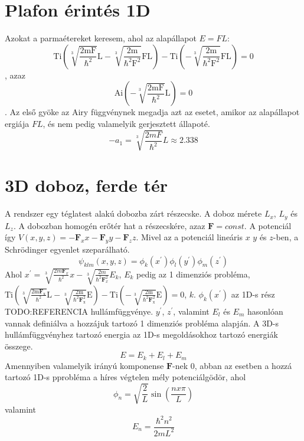 \documentclass[a4paper,titlepage]{article}
\newcommand{\Ai}[1]{\mathrm{Ai\left(#1\right)}}
\newcommand{\Ti}[1]{\mathrm{Ti\left(#1\right)}}
\begin{document}
	
\section{Plafon érintés 1D}
	Azokat a parmaétereket keresem, ahol az alapállapot $E = FL$:
	\begin{equation}
		\Ti{\sqrt[3]{\frac{2mF}{\hbar^2}}L - \sqrt[3]{\frac{2m}{\hbar^2F^2}}FL} - \Ti{-\sqrt[3]{\frac{2m}{\hbar^2F^2}}FL} = 0
	\end{equation}
	, azaz
	\begin{equation}
		\Ai{-\sqrt[3]{\frac{2mF}{\hbar^2}}L} = 0
	\end{equation}
	. Az első gyöke az Airy függvénynek megadja azt az esetet, amikor az alapállapot ergiája $FL$, és nem pedig valamelyik gerjesztett állapoté.
	\begin{equation}
		-a_1 = \sqrt[3]{\frac{2mF}{\hbar^2}}L \approx 2.338
	\end{equation}



\section{3D doboz, ferde tér}
    A rendszer egy téglatest alakú dobozba zárt részecske. A doboz mérete $L_x$, $L_y$ és $L_z$. A dobozban homogén erőtér hat a részecskére, azaz $\boldsymbol{F} = const$. A potenciál így $V(x, y, z) = -\boldsymbol{F}_xx-\boldsymbol{F}_yy-\boldsymbol{F}_zz$. Mivel az a potenciál lineáris $x$ $y$ és $z$-ben, a Schrödinger egyenlet szeparálható.
    \begin{equation}
        \psi_{klm}\left(x, y, z\right) = \phi_k \left( x^\prime \right)\phi_l\left(y^\prime\right)\phi_m\left(z^\prime\right)
    \end{equation}
    Ahol $x^\prime = \sqrt[3]{\frac{2m\boldsymbol{F}_x}{\hbar^2}}x - \sqrt[3]{\frac{2m}{\hbar^2\boldsymbol{F}_x^2}}E_k$, $E_k$ pedig az 1 dimenziós probléma, $\Ti{\sqrt[3]{\frac{2m\boldsymbol{F}_x}{\hbar^2}}L - \sqrt[3]{\frac{2m}{\hbar^2\boldsymbol{F}_x^2}}E} - \Ti{-\sqrt[3]{\frac{2m}{\hbar^2\boldsymbol{F}_x^2}}E} = 0$, $k$. $\phi_k \left( x^\prime \right)$ az 1D-s rész TODO:REFERENCIA hullámfüggvénye. $y^\prime$, $z^\prime$, valamint $E_l$ és $E_m$ hasonlóan vannak definiálva a hozzájuk tartozó 1 dimenziós probléma alapján. A 3D-s hullámfüggvényhez tartozó energia az 1D-s megoldásokhoz tartozó energiák összege.
    \begin{equation}
        E = E_k + E_l + E_m
    \end{equation}
    Amennyiben valamelyik irányú komponense $\boldsymbol{F}$-nek 0, abban az esetben a hozzá tartozó 1D-s pprobléma a híres végtelen mély potenciálgödör, ahol
    \begin{equation}
        \phi_n = \sqrt{\frac{2}{L}}\sin\left(\frac{nx\pi}{L}\right)
    \end{equation}
    valamint
    \begin{equation}
        E_n = \frac{\hbar^2n^2}{2mL^2}
    \end{equation}
    
\end{document}

